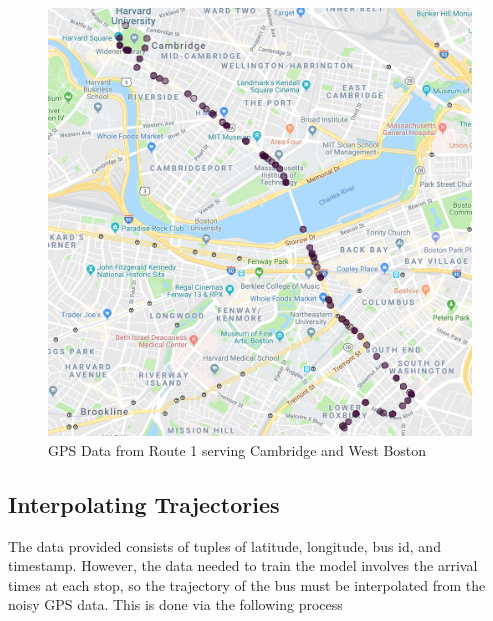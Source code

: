 \begin{figure}
\includegraphics[width=\linewidth]{images/map.png}
\caption{GPS Data from Route 1 serving Cambridge and West Boston}
\label{gps}
\end{figure}

\subsection{Interpolating Trajectories}

The data provided consists of tuples of latitude, longitude, bus id, and timestamp.
However, the data needed to train the model involves the arrival times at each stop, so the trajectory of the bus must be interpolated from the noisy GPS data.
This is done via the following process

